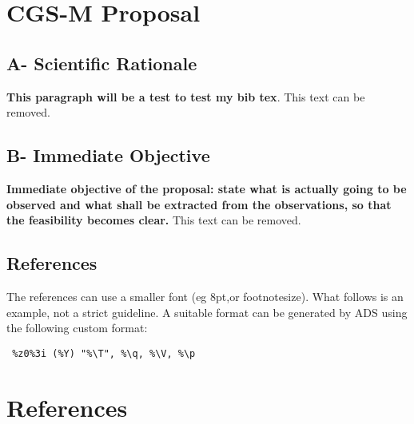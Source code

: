 \documentclass{article}
\begin{document}
\section{CGS-M Proposal}
\subsection{A- Scientific Rationale}

{\bf This paragraph will be a test to test my bib tex}. This text can be removed.

\subsection{B- Immediate Objective}
{\bf Immediate objective of the proposal: state what is actually going to be observed and what shall be extracted from the observations, so that the feasibility becomes clear.} This text can be removed.

\subsection{References}

The references can use a smaller font (eg 8pt,or footnotesize). What follows is an example, not a strict guideline. A suitable format can be generated by ADS using the following custom format: 
\begin{verbatim} %z0%3i (%Y) "%\T", %\q, %\V, %\p 
\end{verbatim}

\section{References}

\end{document}
